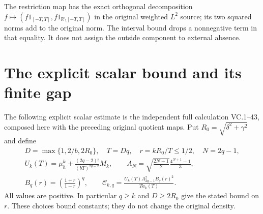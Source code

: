 \documentclass[11pt]{article}
\newcommand{\R}{\mathbb R}
\begin{document}
The restriction map has the exact orthogonal decomposition
$f\mapsto(f1_{[-T,T]},f1_{\R\setminus[-T,T]})$ in the original
weighted $L^2$ source; its two squared norms add to the original norm.
The interval bound drops a nonnegative term in that equality. It does
not assign the outside component to external absence.

\section{The explicit scalar bound and its finite gap}

The following explicit scalar estimate is the independent full calculation
VC.1--43, composed here with the preceding original quotient maps.
Put $R_0=\sqrt{\delta^2+\gamma^2}$ and define
\[
 \begin{gathered}
 D=\max\{1,2/b,2R_0\},\quad T=Dq,\quad r=kR_0/T\le1/2,\quad N=2q-1,\\
 U_k(T)=\mu_h^k+\frac{(2q-2)!}{(bT)^{2q-2}}M_k,\qquad
 A_N=\sqrt{\frac{2N+1}{2}}\frac{4^{N+1}-1}{3},\\
 B_q(r)=\left(\frac{1+r}{1-r}\right)^q,\qquad
 \mathcal C_{k,q}=
       \frac{U_k(T)A_{2q-1}^2B_q(r)^2}{T a_k(T)}.
 \end{gathered}                                             \tag{AU.24}
\]
All values are positive. In particular $q\ge k$ and $D\ge2R_0$
give the stated bound on $r$. These choices bound constants; they do
not change the original density.
\end{document}
